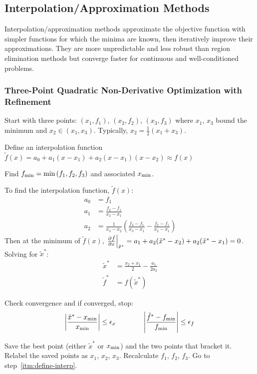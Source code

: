 \documentclass{article}
\begin{document}
\subsection{Interpolation\slash{}Approximation Methods}\label{sec:interp-approx}

Interpolation\slash{}approximation methods approximate the objective function with simpler functions
for which the minima are known, then iteratively improve their approximations. They are more
unpredictable and less robust than region elimination methods but converge faster for continuous and
well-conditioned problems.

\subsubsection{Three-Point Quadratic Non-Derivative Optimization with Refinement}\label{sec:quadratic-interpolation}

\begin{enumerate*}
\item Start with three points: \((x_1, f_1)\), \((x_2, f_2)\), \((x_3, f_3)\) where \(x_1\),
  \(x_3\) bound the minimum and \(x_2 \in (x_1, x_3)\). Typically, \(x_2 = \frac12(x_1 + x_3)\).
\item \label{itm:define-interp} Define an interpolation function \(\tilde{f}(x) = a_0 + a_1(x - x_1)
  + a_2(x - x_1)(x - x_2) \approx f(x)\)
\item Find \(f_{\mathrm{min}} = \min{(f_1, f_2, f_3)}\) and associated \(x_{\mathrm{min}}\).
\item To find the interpolation function, \(\tilde{f}(x)\):
\begin{align*}
  a_0 &= f_1 \\
  a_1 &= \frac{f_2 - f_1}{x_2 - x_1} \\
  a_2 &= \frac{1}{x_3 - x_2}\left(\frac{f_3 - f_1}{x_3 - x_1} - \frac{f_2 - f_1}{x_2 - x_1}\right)
\end{align*}
Then at the minimum of \(\tilde{f}(x)\), \(\left.\pd{\tilde{f}}{x}\right|_{\tilde{x}^*} = a_1 +
a_2(\tilde{x}^* - x_2) + a_2(\tilde{x}^* - x_1) = 0\). Solving for \(\tilde{x}^*\):
\begin{align*}
\tilde{x}^* &= \frac{x_2 + x_1}{2} - \frac{a_1}{2a_2} \\
\tilde{f}^* &= f(\tilde{x}^*)
\end{align*}
\item Check convergence and if converged, stop:
\[\abs{\frac{\tilde{x}^* - x_{\mathrm{min}}}{x_{\mathrm{min}}}} \le \epsilon_x \qquad \qquad
\abs{\frac{\tilde{f}^* - f_{\mathrm{min}}}{f_{\mathrm{min}}}} \le \epsilon_f\]
\item Save the best point (either \(\tilde{x}^*\) or \(x_{\mathrm{min}}\)) and the two points that
  bracket it. Relabel the saved points as \(x_1\), \(x_2\), \(x_3\). Recalculate \(f_1\), \(f_2\),
  \(f_3\). Go to step~\ref{itm:define-interp}.
\end{enumerate*}
\end{document}
